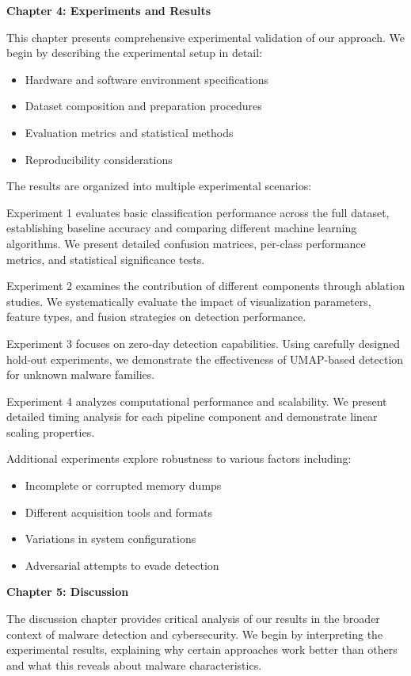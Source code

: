 \textbf{Chapter 4: Experiments and Results}

This chapter presents comprehensive experimental validation of our approach. We begin by describing the experimental setup in detail:
\begin{itemize}
\item Hardware and software environment specifications
\item Dataset composition and preparation procedures
\item Evaluation metrics and statistical methods
\item Reproducibility considerations
\end{itemize}

The results are organized into multiple experimental scenarios:

Experiment 1 evaluates basic classification performance across the full dataset, establishing baseline accuracy and comparing different machine learning algorithms. We present detailed confusion matrices, per-class performance metrics, and statistical significance tests.

Experiment 2 examines the contribution of different components through ablation studies. We systematically evaluate the impact of visualization parameters, feature types, and fusion strategies on detection performance.

Experiment 3 focuses on zero-day detection capabilities. Using carefully designed hold-out experiments, we demonstrate the effectiveness of UMAP-based detection for unknown malware families.

Experiment 4 analyzes computational performance and scalability. We present detailed timing analysis for each pipeline component and demonstrate linear scaling properties.

Additional experiments explore robustness to various factors including:
\begin{itemize}
\item Incomplete or corrupted memory dumps
\item Different acquisition tools and formats
\item Variations in system configurations
\item Adversarial attempts to evade detection
\end{itemize}

\textbf{Chapter 5: Discussion}

The discussion chapter provides critical analysis of our results in the broader context of malware detection and cybersecurity. We begin by interpreting the experimental results, explaining why certain approaches work better than others and what this reveals about malware characteristics.


